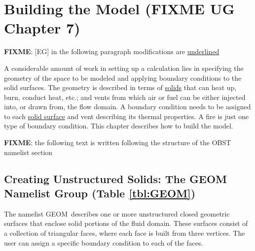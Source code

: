 \documentclass[12pt]{article}
\begin{document}


\vspace{1.0in}

%
%
%
%
%
%
% 
%


\chapter{Building the Model (FIXME UG Chapter 7)}

\textbf{FIXME}: [EG] in the following paragraph modifications are \underline{underlined}

A considerable amount of work in setting up a calculation lies in specifying the geometry of the space to
be modeled and applying boundary conditions to the solid surfaces. The geometry is described in terms of
\underline{solids} that can heat up, burn, conduct heat, etc.; and vents from which air or fuel can be
either injected into, or drawn from, the flow domain. A boundary condition needs to be assigned to each
\underline{solid surface} and vent describing its thermal properties. A fire is just one type of boundary condition.
This chapter describes how to build the model.

\textbf{FIXME}: the following text is written following the structure of the {\ct OBST} namelist section

\section{Creating Unstructured Solids: The \texorpdfstring{{\ct GEOM}}{GEOM} Namelist Group (Table \ref{tbl:GEOM})}
\label{info:GEOM}

The namelist {\ct GEOM}\ describes one or more unstructured closed geometric surfaces that enclose solid portions
of the fluid domain. These surfaces consist of a collection of triangular faces, where each face is built
from three vertices. The user can assign a specific boundary condition to each of the faces.
\end{document}
